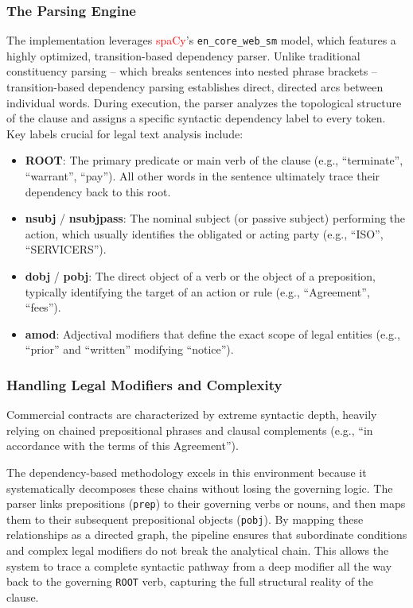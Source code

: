 \documentclass[twoside,final]{hcmut-report}
\begin{document}
\subsubsection*{The Parsing Engine}
The implementation leverages \textcolor{red}{spaCy}'s \texttt{en\_core\_web\_sm} model, which features a highly optimized, transition-based dependency parser. Unlike traditional constituency parsing -- which breaks sentences into nested phrase brackets -- transition-based dependency parsing establishes direct, directed arcs between individual words. During execution, the parser analyzes the topological structure of the clause and assigns a specific syntactic dependency label to every token. Key labels crucial for legal text analysis include:
\begin{itemize}[topsep=0pt, parsep=0pt, itemsep=0pt]
  \item \textbf{ROOT}: The primary predicate or main verb of the clause (e.g., ``terminate'', ``warrant'', ``pay''). All other words in the sentence ultimately trace their dependency back to this root.
  \item \textbf{nsubj} / \textbf{nsubjpass}: The nominal subject (or passive subject) performing the action, which usually identifies the obligated or acting party (e.g., ``ISO'', ``SERVICERS'').
  \item \textbf{dobj} / \textbf{pobj}: The direct object of a verb or the object of a preposition, typically identifying the target of an action or rule (e.g., ``Agreement'', ``fees'').
  \item \textbf{amod}: Adjectival modifiers that define the exact scope of legal entities (e.g., ``prior'' and ``written'' modifying ``notice'').
\end{itemize}

\subsubsection*{Handling Legal Modifiers and Complexity}
Commercial contracts are characterized by extreme syntactic depth, heavily relying on chained prepositional phrases and clausal complements (e.g., ``in accordance with the terms of this Agreement'').

\medskip

The dependency-based methodology excels in this environment because it systematically decomposes these chains without losing the governing logic. The parser links prepositions (\texttt{prep}) to their governing verbs or nouns, and then maps them to their subsequent prepositional objects (\texttt{pobj}). By mapping these relationships as a directed graph, the pipeline ensures that subordinate conditions and complex legal modifiers do not break the analytical chain. This allows the system to trace a complete syntactic pathway from a deep modifier all the way back to the governing \texttt{ROOT} verb, capturing the full structural reality of the clause.
\end{document}
